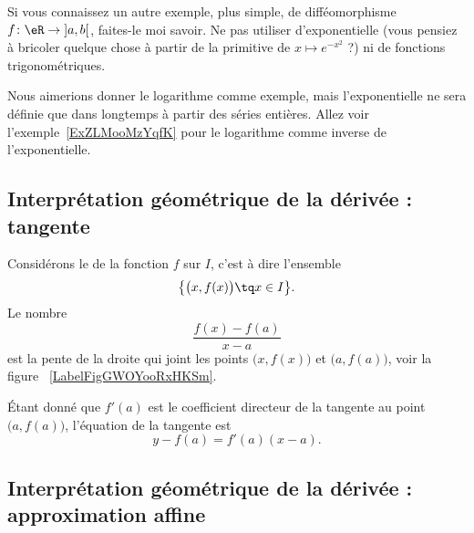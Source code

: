 \begin{probleme}
Si vous connaissez un autre exemple, plus simple, de difféomorphisme \( f\colon \eR\to \mathopen] a , b \mathclose[\), faites-le moi savoir. Ne pas utiliser d'exponentielle (vous pensiez à bricoler quelque chose à partir de la primitive de \( x\mapsto  e^{-x^2}\) ?) ni de fonctions trigonométriques.
\end{probleme}

\begin{example}
    Nous aimerions donner le logarithme comme exemple, mais l'exponentielle ne sera définie que dans longtemps à partir des séries entières. Allez voir l'exemple~\ref{ExZLMooMzYqfK} pour le logarithme comme inverse de l'exponentielle.
\end{example}

\subsection[Interprétation géométrique : tangente]{Interprétation géométrique de la dérivée : tangente}

Considérons le  de la fonction $f$ sur $I$, c'est à dire l'ensemble
\begin{equation}
	\big\{ \big( x,f(x) \big)\tq x\in I \big\}.
\end{equation}
Le nombre
\begin{equation}
	\frac{ f(x)-f(a) }{ x-a }
\end{equation}
est la pente de la droite qui joint les points $\big( x,f(x) \big)$ et $\big( a,f(a) \big)$, voir la figure ~\ref{LabelFigGWOYooRxHKSm}. %
\newcommand{\CaptionFigGWOYooRxHKSm}{Le coefficient directeur de la corde entre $a$ et $x$.}


Étant donné que $f'(a)$ est le coefficient directeur de la tangente au point $\big( a,f(a) \big)$, l'équation de la tangente est
\begin{equation}		\label{EqTgfaen}
	y-f(a)=f'(a)(x-a).
\end{equation}

\subsection[Interprétation géométrique : approximation affine]{Interprétation géométrique de la dérivée : approximation affine}


